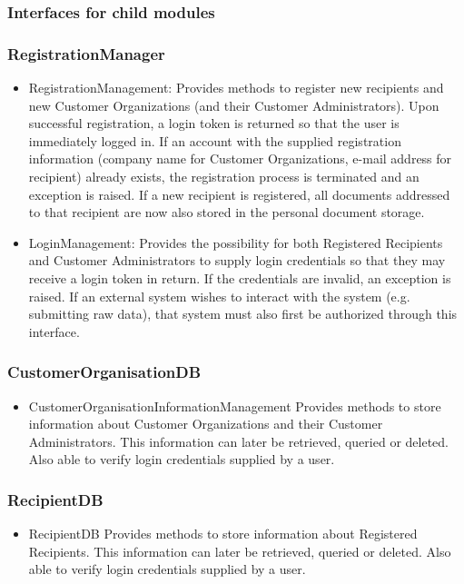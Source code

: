 \documentclass[a4paper,10pt]{article}
\begin{document}
\subsubsection{Interfaces for child modules}
\subsubsection*{RegistrationManager}
\begin{itemize}
    \item RegistrationManagement:
    Provides methods to register new recipients and new Customer Organizations (and their Customer Administrators). Upon successful registration, a login token is returned so that the user is immediately logged in. If an account with the supplied registration information (company name for Customer Organizations, e-mail address for recipient) already exists, the registration process is terminated and an exception is raised. If a new recipient is registered, all documents addressed to that recipient are now also stored in the personal document storage.

    \item LoginManagement:
    Provides the possibility for both Registered Recipients and Customer Administrators to supply login credentials so that they may receive a login token in return. If the credentials are invalid, an exception is raised. If an external system wishes to interact with the system (e.g. submitting raw data), that system must also first be authorized through this interface.
\end{itemize}

\subsubsection*{CustomerOrganisationDB}
\begin{itemize}
	\item CustomerOrganisationInformationManagement
	Provides methods to store information about Customer Organizations and their Customer Administrators. This information can later be retrieved, queried or deleted. Also able to verify login credentials supplied by a user.
\end{itemize}

\subsubsection*{RecipientDB}
\begin{itemize}
	\item RecipientDB
	Provides methods to store information about Registered Recipients. This information can later be retrieved, queried or deleted. Also able to verify login credentials supplied by a user.
\end{itemize}
\end{document}
